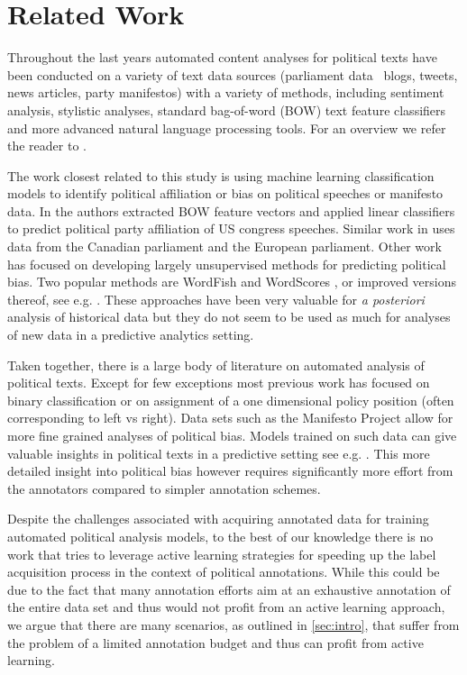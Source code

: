 \documentclass[runningheads,a4paper]{article}
\begin{document}
\section{Related Work}\label{sec:related}

Throughout the last years automated content analyses for political texts have been conducted on a variety of text data sources (parliament data \, blogs, tweets, news articles, party manifestos) with a variety of methods, including sentiment analysis, stylistic analyses, standard bag-of-word (BOW) text feature classifiers and more advanced natural language processing tools. For an overview we refer the reader to \cite{Grimmer2013,Kaal2014}. 

The work closest related to this study is using machine learning classification models to identify political affiliation or bias on political speeches or manifesto data. In \cite{Yu2008} the authors extracted BOW feature vectors and applied linear classifiers to predict political party affiliation of US congress speeches. Similar work in \cite{Hirst2014} uses data from the Canadian parliament and the European parliament. 
Other work has focused on developing largely unsupervised methods for predicting political bias. Two popular methods are WordFish \cite{Slapin08ascaling} and WordScores \cite{Laver2003}, or improved versions thereof, see e.g. \cite{Lowe09scalingpolicy}. These approaches have been very valuable for {\em a posteriori} analysis of historical data but they do not seem to be used as much for analyses of new data in a predictive analytics setting. 

Taken together, there is a large body of literature on automated analysis of political texts. Except for few exceptions most previous work has focused on binary classification or on assignment of a one dimensional policy position (often corresponding to left vs right). Data sets such as the Manifesto Project allow for more fine grained analyses of political bias. Models trained on such data can give valuable insights in political texts in a predictive setting see e.g. \cite{Merz2016,Biessmann16}. This more detailed insight into political bias however requires significantly more effort from the annotators compared to simpler annotation schemes. 

Despite the challenges associated with acquiring annotated data for training automated political analysis models, to the best of our knowledge there is no work that tries to leverage active learning strategies for speeding up the label acquisition process in the context of political annotations. While this could be due to the fact that many annotation efforts aim at an exhaustive annotation of the entire data set and thus would not profit from an active learning approach, we argue that there are many scenarios, as outlined in \autoref{sec:intro}, that suffer from the problem of a limited annotation budget and thus can profit from active learning.
\end{document}
